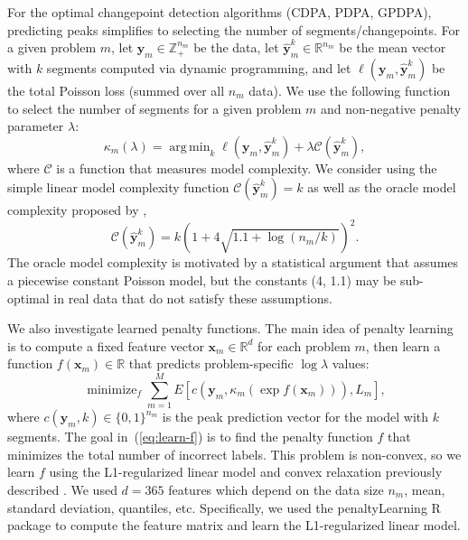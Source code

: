 \documentclass[twoside,11pt]{article}
\DeclareMathOperator*{\argmin}{arg\,min}
\DeclareMathOperator*{\minimize}{minimize}
\newcommand{\ZZ}{\mathbb Z}
\newcommand{\RR}{\mathbb R}
\begin{document}
For the optimal changepoint detection algorithms (CDPA, PDPA, GPDPA),
predicting peaks simplifies to selecting the number of
segments/changepoints. For a given problem $m$, let
$\mathbf y_m\in\ZZ_+^{n_m}$ be the data, let
$\mathbf{\hat y}_m^k\in\RR^{n_m}$ be the mean vector with $k$
segments computed via dynamic programming, and let $\ell(\mathbf y_m, \mathbf{\hat y}^k_m)$ be the
total Poisson loss (summed over all $n_m$ data). We use the following
function to select the number of segments for a given
problem $m$ and non-negative penalty parameter $\lambda$:
\begin{equation}
  \kappa_m(\lambda)=\argmin_{k} \ell(\mathbf y_m, \mathbf{\hat y}^k_m)
+ \lambda \mathcal C(\mathbf{\hat y}^k_m),
\end{equation} 
where $\mathcal C$ is a function that measures model complexity. We consider using the simple linear model complexity function $\mathcal C(\mathbf{\hat y}^k_m)=k$ as well as the oracle model complexity
proposed by \citet{cleynen2013segmentation},
\begin{equation}
\label{eq:oracle}
\mathcal C(\mathbf{\hat y}^k_m) =
k\left(
1 + 4\sqrt{1.1 + \log( n_m/k)}
\right)^2.
\end{equation}
The oracle model complexity is motivated by a statistical argument that assumes a piecewise constant Poisson model, but
the constants (4, 1.1) may be sub-optimal in real data that do not satisfy these assumptions. 

We also investigate learned penalty functions.  The main idea of penalty learning \citep{HOCKING-penalties} is to
compute a fixed feature vector $\mathbf x_m\in\RR^d$ for each problem
$m$, then learn a function $f(\mathbf x_m)\in\RR$ that predicts
problem-specific $\log\lambda$ values:
\begin{equation}
  \label{eq:learn-f}
  \minimize_{f}
  \sum_{m=1}^M E\left[
    c(\mathbf y_m, \kappa_m(\exp f(\mathbf x_m))), 
    L_m\right],
\end{equation}
where $c(\mathbf y_m, k)\in\{0,1\}^{n_m}$ is the peak prediction
vector for the model with $k$ segments. The goal in~(\ref{eq:learn-f})
is to find the penalty function $f$ that minimizes the total number of
incorrect labels. This problem is non-convex, so we learn $f$ using
the L1-regularized linear model and convex relaxation previously
described \citep{HOCKING-penalties}. We used $d=365$ features which
depend on the data size $n_m$, mean, standard deviation, quantiles,
etc. Specifically, we used the penaltyLearning R
package to compute the feature matrix and learn the L1-regularized
linear model.
\end{document}
